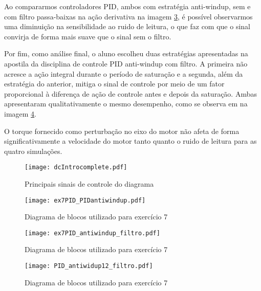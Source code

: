 Ao compararmos controladores PID, ambos com estratégia anti-windup, sem e com filtro passa-baixas na ação derivativa na imagem \ref{fig:PIDfiltro}, é possível observarmos uma diminuição na sensibilidade ao ruido de leitura, o que faz com que o sinal convirja de forma mais suave que o sinal sem o filtro.

Por fim, como análise final, o aluno escolheu duas estratégias apresentadas na apostila da disciplina de controle PID anti-windup com filtro. A primeira não acresce a ação integral durante o período de saturação e a segunda, além da estratégia do anterior, mitiga o sinal de controle por meio de um fator proporcional à diferença de ação de controle antes e depois da saturação. Ambas apresentaram qualitativamente o mesmo desempenho, como se observa em na imagem \ref{fig:PIDantiwindup12}.

O torque fornecido como perturbação no eixo do motor não afeta de forma  significativamente a velocidade do motor tanto quanto o ruido de leitura para as quatro simulações.

\begin{figure}[H]
    \center
    \texttt{[image: dcIntrocomplete.pdf]}
    \caption{Principais sinais de controle do diagrama} 
    \label{fig:dcIntrocomplete}
\end{figure}

\begin{figure}[H]
    \center
    \texttt{[image: ex7PID\_PIDantiwindup.pdf]}
    \caption{Diagrama de blocos utilizado para exercício 7}
    \label{fig:PIDantiwindup}
\end{figure}

\begin{figure}[H]
    \center
    \texttt{[image: ex7PID\_antiwindup\_filtro.pdf]}
    \caption{Diagrama de blocos utilizado para exercício 7}
    \label{fig:PIDfiltro}
\end{figure}

\begin{figure}[H]
    \center
    \texttt{[image: PID\_antiwidup12\_filtro.pdf]}
    \caption{Diagrama de blocos utilizado para exercício 7}
    \label{fig:PIDantiwindup12}
\end{figure}
